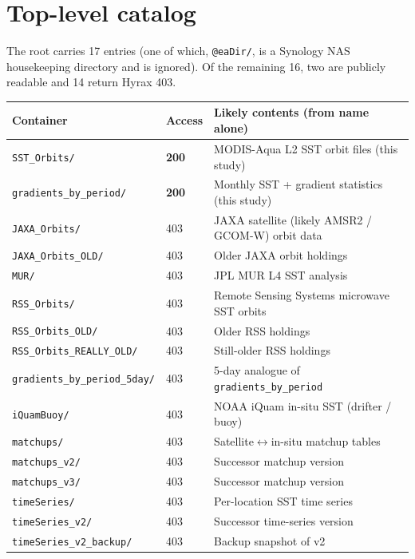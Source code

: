 \documentclass[11pt]{article}
\begin{document}
\section{Top-level catalog}\label{sec:catalog}

The root carries 17 entries (one of which, \texttt{@eaDir/}, is a
Synology NAS housekeeping directory and is ignored). Of the remaining
16, two are publicly readable and 14 return Hyrax 403.

\begin{center}
\begin{tabular}{@{}lll@{}}
\toprule
Container & Access & Likely contents (from name alone) \\
\midrule
\texttt{SST\_Orbits/}             & \textbf{200} & MODIS-Aqua L2 SST orbit files (this study) \\
\texttt{gradients\_by\_period/}   & \textbf{200} & Monthly SST + gradient statistics (this study) \\
\midrule
\texttt{JAXA\_Orbits/}            & 403 & JAXA satellite (likely AMSR2 / GCOM-W) orbit data \\
\texttt{JAXA\_Orbits\_OLD/}       & 403 & Older JAXA orbit holdings \\
\texttt{MUR/}                     & 403 & JPL MUR L4 SST analysis \\
\texttt{RSS\_Orbits/}             & 403 & Remote Sensing Systems microwave SST orbits \\
\texttt{RSS\_Orbits\_OLD/}        & 403 & Older RSS holdings \\
\texttt{RSS\_Orbits\_REALLY\_OLD/}& 403 & Still-older RSS holdings \\
\texttt{gradients\_by\_period\_5day/} & 403 & 5-day analogue of \texttt{gradients\_by\_period} \\
\texttt{iQuamBuoy/}               & 403 & NOAA iQuam in-situ SST (drifter / buoy) \\
\texttt{matchups/}                & 403 & Satellite$\leftrightarrow$in-situ matchup tables \\
\texttt{matchups\_v2/}            & 403 & Successor matchup version \\
\texttt{matchups\_v3/}            & 403 & Successor matchup version \\
\texttt{timeSeries/}              & 403 & Per-location SST time series \\
\texttt{timeSeries\_v2/}          & 403 & Successor time-series version \\
\texttt{timeSeries\_v2\_backup/}  & 403 & Backup snapshot of v2 \\
\bottomrule
\end{tabular}
\end{center}
\end{document}

